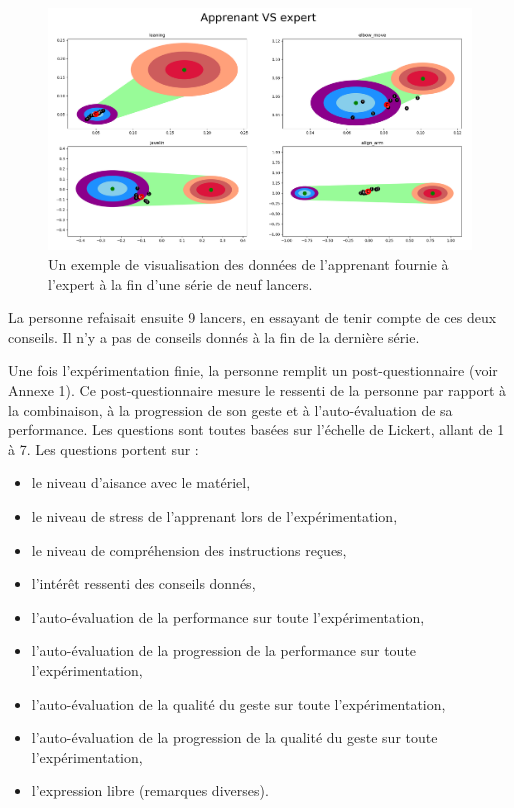 \begin{figure}
    \centering
    \includegraphics[width=15cm]{pictures/feedback_grp_example.png}
    \caption[Exemple de visualisation à la fin des séries de lancer]{Un exemple de visualisation des données de l'apprenant fournie à l'expert à la fin d'une série de neuf lancers.}
    \label{fig:feedback_grp_example}
\end{figure}

La personne refaisait ensuite 9 lancers, en essayant de tenir compte de ces deux conseils. Il n'y a pas de conseils donnés à la fin de la dernière série.

Une fois l'expérimentation finie, la personne remplit un post-questionnaire (voir Annexe 1). Ce post-questionnaire mesure le ressenti de la personne par rapport à la combinaison, à la progression de son geste et à l'auto-évaluation de sa performance. Les questions sont toutes basées sur l'échelle de Lickert, allant de 1 à 7. Les questions portent sur :
\begin{itemize}
	\item le niveau d'aisance avec le matériel,
	\item le niveau de stress de l'apprenant lors de l'expérimentation,
	\item le niveau de compréhension des instructions reçues,
	\item l'intérêt ressenti des conseils donnés,
	\item l'auto-évaluation de la performance sur toute l'expérimentation,
	\item l'auto-évaluation de la progression de la performance sur toute l'expérimentation,
	\item l'auto-évaluation de la qualité du geste sur toute l'expérimentation,
	\item l'auto-évaluation de la progression de la qualité du geste sur toute l'expérimentation,
	\item l'expression libre (remarques diverses).
\end{itemize}


